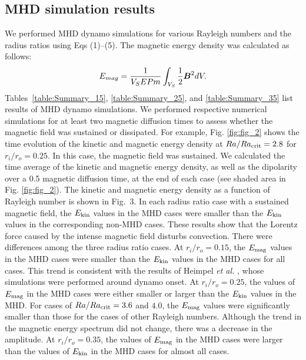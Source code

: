 \subsection{MHD simulation results}

We performed MHD dynamo simulations for various Rayleigh numbers and the radius ratios using Eqs (1)--(5). The magnetic energy density was calculated as follows:
%
\begin{equation}
E_{mag} = \frac{1}{V_{S}E Pm} \int_{V_{S}} \frac{1}{2} \mbox{\boldmath$B$}^{2} dV.
\label{eq:magnetic_energy}
\end{equation}
%
Tables~\ref{table:Summary_15}, \ref{table:Summary_25}, and \ref{table:Summary_35} list results of MHD dynamo simulations. 
We performed respective numerical simulations for at least two magnetic diffusion times to assess whether the magnetic field was sustained or dissipated. 
For example, Fig. \ref{fig:fig_2} shows the time evolution of the kinetic and magnetic energy density at $Ra/Ra_{\rm crit} = 2.8$ for $r_i/r_o = 0.25$. 
In this case, the magnetic field was sustained. 
We calculated the time average of the kinetic and magnetic energy density, as well as the dipolarity over a 0.5 magnetic diffusion time, at the end of each case (see shaded area in Fig. \ref{fig:fig_2}). The kinetic and magnetic energy density as a function of Rayleigh number is shown in Fig.~3.%
In each radius ratio case with a sustained magnetic field, the $E_{\rm kin}$ values in the MHD cases were smaller than the $E_{\rm kin}$ values in the corresponding non-MHD cases. 
These results show that the Lorentz force caused by the intense magnetic field disturbs convection.
There were differences among the three radius ratio cases. 
At $r_i/r_o = 0.15$, the $E_{\rm mag}$ values in the MHD cases were smaller than the $E_{\rm kin}$ values in the MHD cases for all cases. 
This trend is consistent with the results of Heimpel {\it et al.} , whose simulations were performed around dynamo onset. 
At $r_i/r_o = 0.25$, the values of $E_{\rm mag}$ in the MHD cases were either smaller or larger than the $E_{\rm kin}$ values in the MHD. For cases of $Ra/Ra_{\rm crit}  = 3.6$ and $4.0$, the $E_{\rm mag}$ values were significantly smaller than those for the cases of other Rayleigh numbers. 
Although the trend in the magnetic energy spectrum did not change, there was a decrease in the amplitude. At $r_i/r_o = 0.35$, the values of $E_{\rm mag}$ in the MHD cases were larger than the values of $E_{\rm kin}$ in the MHD cases for almost all cases. 
